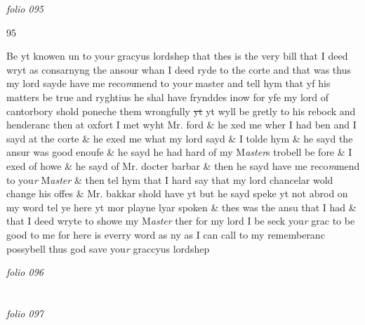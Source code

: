 \documentclass[12pt, a4paper]{book}
\begin{document}
\textit{folio 095}



\begin{flushright}{\color{Mahogany}95}\end{flushright}

	
		\ifthenelse{\isodd{\thepage}}
		{\reversemarginpar}
		{\normalmarginpar}
		Be yt knowen un to you\textit{r} gracyus lordshep that thes is the very bill
 that I deed wryt as consarnyng the ansour whan I deed ryde
 to the corte and that was thus my lord sayde have me reco\textit{m}mend
 to you\textit{r} master and tell hym that yf his matters be true and ryghtius
		he shal have frynddes inow for yfe my lord of cantorbory shold
 poneche them wrongfully \sout{yt} yt wyll be gretly to his rebock
 and henderanc then at oxfort I met wyht Mr. ford \& he xed me
 wher I had ben and I sayd at the corte \& he exed me what my
 lord sayd \& I tolde hym \& he sayd the ansur was good enoufe \&
 he sayd he had hard of my M\textit{aster}s trobell be fore \& I exed of howe
 \& he sayd of Mr. docter barbar \& then he sayd have me reco\textit{m}mend
 to you\textit{r} M\textit{aster }\& then tel hym that I hard say that my lord
 chancelar wold change his offes \& Mr. bakkar shold have yt
			 but he sayd speke yt not
 abrod on my word tel ye here yt mor playne lyar spoken
 \& thes was the ansu that I had \& that I deed wryte
 to showe my M\textit{aster} ther for my lord I be seck you\textit{r} grac to be
 good to me for here is everry word as ny as I can call to
 my rememberanc possybell thus god save you\textit{r} graccyus
 lordshep

\dotfill
					

\textit{folio 096}


         \vspace{4cm}
         
\dotfill
					  \section*{}  \subsection*{}

\textit{folio 097}
\end{document}
